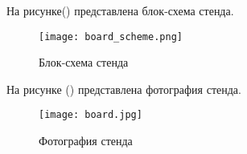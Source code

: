 На рисунке() представлена блок-схема стенда.\par
\begin{figure}[ht]
    \centering
    \texttt{[image: board\_scheme.png]}
    \caption{Блок-схема стенда}
    \label{fig:mpr}
\end{figure}
На рисунке () представлена фотография стенда.
\begin{figure}[ht]
    \centering
    \texttt{[image: board.jpg]}
    \caption{Фотография стенда}
    \label{fig:mpr}
\end{figure}
